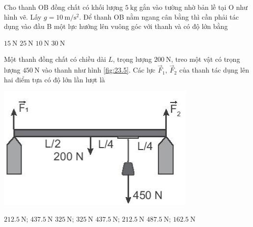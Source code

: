 \begin{ex}
	Cho thanh OB đồng chất có khối lượng $\SI{5}{\kilogram}$ gắn vào tường nhờ bản lề tại O như hình vẽ. Lấy $g=\SI{10}{\meter/\second^2}$. Để thanh OB nằm ngang cân bằng thì cần phải tác dụng vào đầu B một lực hướng lên vuông góc với thanh và có độ lớn bằng
	\begin{center}
	\end{center}
	\choice
	{$\SI{15}{\newton}$}
	{\True $\SI{25}{\newton}$}
	{$\SI{10}{\newton}$}
	{$\SI{30}{\newton}$}
	\loigiai{}
\end{ex}
\begin{ex}
	Một thanh đồng chất có chiều dài $L$, trọng lượng $\SI{200}{\newton}$, treo một vật có trọng lượng $\SI{450}{\newton}$ vào thanh như hình \ref{fig:23.5}. Các lực $\vec F_1$, $\vec F_2$ của thanh tác dụng lên hai điểm tựa có độ lớn lần lượt là
	\begin{center}
		\includegraphics[width=0.4\linewidth]{../figs/VN10-2022-PH-TP023-P-5}
		\label{fig:23.5}
	\end{center}
	\choice
	{\True $\SI{212.5}{\newton}$; $\SI{437.5}{\newton}$}
	{$\SI{325}{\newton}$; $\SI{325}{\newton}$}
	{$\SI{437.5}{\newton}$; $\SI{212.5}{\newton}$}
	{$\SI{487.5}{\newton}$; $\SI{162.5}{\newton}$}
\end{ex}
